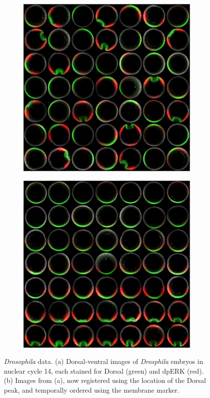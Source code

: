 \documentclass{pnastwo}
\begin{document}
\begin{figure}
\begin{subfigure}{0.25\textwidth}
\includegraphics[width=\textwidth]{fig2a}
\caption{}
\label{subfig:images_scrambled}
\end{subfigure}
\begin{subfigure}{0.25\textwidth}
\includegraphics[width=\textwidth]{fig2b}
\caption{}
\label{subfig:images_hand_ordered}
\end{subfigure}
\caption{{\em Drosophila} data. (a) Dorsal-ventral images of {\em Drosphila} embryos in nuclear cycle 14, each stained for Dorsal (green) and dpERK (red). (b) Images from (a), now registered using the location of the Dorsal peak, and temporally ordered using the membrane marker.} 
\label{fig:fluorescent_images}
\end{figure}
\end{document}
